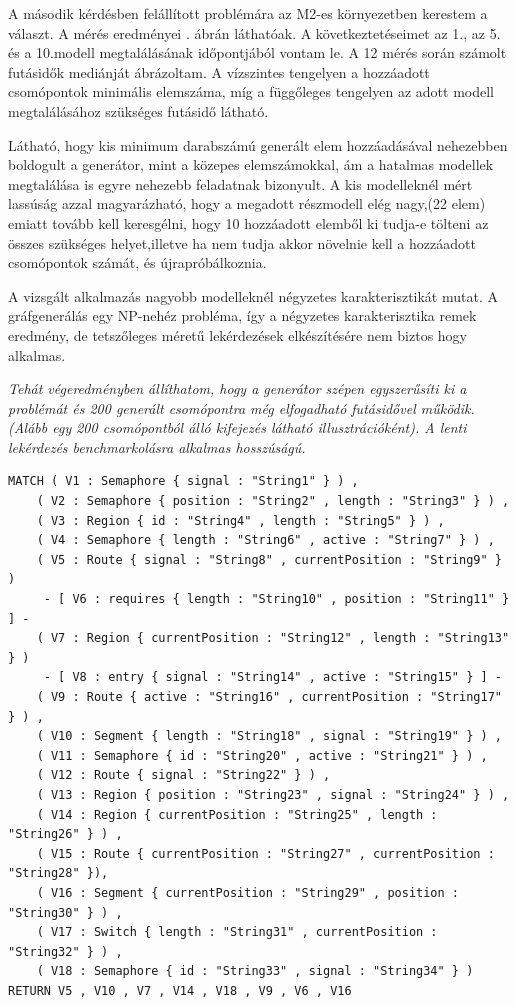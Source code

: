 A második kérdésben felállított problémára az M2-es környezetben kerestem a választ. A mérés eredményei . ábrán láthatóak. A következtetéseimet az 1., az 5. és a 10.modell megtalálásának  időpontjából vontam le. A 12 mérés során számolt futásidők mediánját ábrázoltam. A vízszintes tengelyen a hozzáadott csomópontok minimális elemszáma, míg a függőleges tengelyen az adott modell megtalálásához szükséges futásidő látható. 

Látható, hogy kis minimum darabszámú generált elem hozzáadásával nehezebben boldogult a generátor, mint a közepes elemszámokkal, ám a hatalmas modellek megtalálása is egyre nehezebb feladatnak bizonyult. A kis modelleknél mért lassúság azzal magyarázható, hogy a megadott részmodell elég nagy,(22 elem) emiatt tovább kell keresgélni, hogy 10 hozzáadott elemből ki tudja-e tölteni az összes szükséges helyet,illetve ha nem tudja akkor növelnie kell a hozzáadott csomópontok számát, és újrapróbálkoznia. 

A vizsgált alkalmazás nagyobb modelleknél négyzetes karakterisztikát mutat. A gráfgenerálás egy NP-nehéz probléma, így a négyzetes karakterisztika remek eredmény, de tetszőleges méretű lekérdezések elkészítésére nem biztos hogy alkalmas.

\textit{Tehát végeredményben állíthatom, hogy a generátor szépen egyszerűsíti ki a problémát és 200 generált csomópontra még elfogadható futásidővel működik. (Alább egy 200 csomópontból álló kifejezés látható illusztrációként). A lenti lekérdezés benchmarkolásra alkalmas hosszúságú.}

\begin{lstlisting}[style=cyphersmall]
MATCH ( V1 : Semaphore { signal : "String1" } ) ,
	( V2 : Semaphore { position : "String2" , length : "String3" } ) ,
	( V3 : Region { id : "String4" , length : "String5" } ) ,
	( V4 : Semaphore { length : "String6" , active : "String7" } ) ,
	( V5 : Route { signal : "String8" , currentPosition : "String9" } )
	 - [ V6 : requires { length : "String10" , position : "String11" } ] - 
	( V7 : Region { currentPosition : "String12" , length : "String13" } )
	 - [ V8 : entry { signal : "String14" , active : "String15" } ] -
	( V9 : Route { active : "String16" , currentPosition : "String17" } ) ,
	( V10 : Segment { length : "String18" , signal : "String19" } ) ,
	( V11 : Semaphore { id : "String20" , active : "String21" } ) ,
	( V12 : Route { signal : "String22" } ) ,
	( V13 : Region { position : "String23" , signal : "String24" } ) ,
	( V14 : Region { currentPosition : "String25" , length : "String26" } ) ,
	( V15 : Route { currentPosition : "String27" , currentPosition : "String28" }),
	( V16 : Segment { currentPosition : "String29" , position : "String30" } ) ,
	( V17 : Switch { length : "String31" , currentPosition : "String32" } ) ,
	( V18 : Semaphore { id : "String33" , signal : "String34" } )
RETURN V5 , V10 , V7 , V14 , V18 , V9 , V6 , V16
\end{lstlisting}




